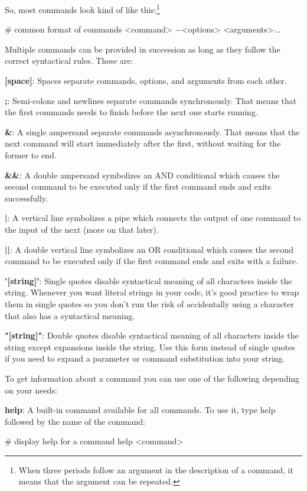 So, most commands look kind of like this:\footnote{When three periods follow an argument in the description of a
command, it means that the argument can be repeated.}
\begin{bash}
# common format of commands
<command> $-$<options> <arguments>...
\end{bash}

Multiple commands can be provided in succession as long as they follow the correct syntactical rules. These are:
\bit
\item \textbf{[space]}: Spaces separate commands, options, and arguments from each other.
\item \textbf{;}: Semi-colons and newlines separate commands synchronously. That means that the first commands needs to
finish before the next one starts running.
\item \textbf{\&}: A single ampersand separate commands asynchronously. That means that the next command will start
immediately after the first, without waiting for the former to end.
\item \textbf{\&\&}: A double ampersand symbolizes an AND conditional which causes the second command to be executed only
if the first command ends and exits successfully.
\item \textbf{|}: A vertical line symbolizes a pipe which connects the output of one command to the input of the next
(more on that later).
\item \textbf{||}: A double vertical line symbolizes an OR conditional which causes the second command to be executed
only if the first command ends and exits with a failure.
\item \textbf{'[string]'}: Single quotes disable syntactical meaning of all characters inside the string. Whenever you
want literal strings in your code, it's good practice to wrap them in single quotes so you don't run the risk of
accidentally using a character that also has a syntactical meaning.
\item \textbf{"[string]"}: Double quotes disable syntactical meaning of all characters inside the string except
expansions inside the string. Use this form instead of single quotes if you need to expand a parameter or command
substitution into your string.
\eit

To get information about a command you can use one of the following depending on your needs:
\bit
\item \textbf{help}: A built-in command available for all commands. To use it, type help followed by the name
of the command:
\begin{bash}
# display help for a command
help <command>
\end{bash}

